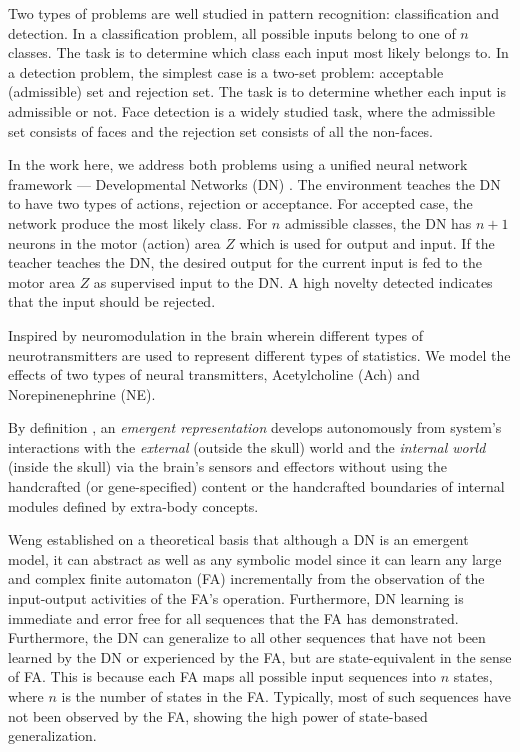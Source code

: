 \documentclass[conference]{IEEEtran}
\begin{document}
Two types of problems are well studied in pattern recognition: classification and detection.   
In a classification problem, all possible inputs belong to one of $n$ classes.   The task is to determine 
which class each input most likely belongs to.   In a detection problem, the simplest case is a two-set
problem: acceptable (admissible) set and rejection set.   The task is to determine whether each input is
admissible or not.   Face detection is a widely studied task, where the admissible set consists of faces and
the rejection set consists of all the non-faces.   

In the work here, we address both problems using a unified neural network framework --- Developmental Networks (DN) \cite{WengNAI12}.    The environment teaches the DN to have two types of actions, 
rejection or acceptance.  For accepted case, the network produce the most likely class.    For $n$ admissible
classes, the DN has $n+1$ neurons in the motor (action) area $Z$ which is used for output and input.
If the teacher teaches the DN, the desired output for the current input is fed to the motor area $Z$ as 
supervised input to the DN.  A high novelty detected indicates that the input should be rejected. 

Inspired by neuromodulation in the brain wherein different types of
neurotransmitters are used to represent different types of statistics.
We model the effects of two types of neural transmitters, Acetylcholine (Ach) and Norepinenephrine (NE).

By definition \cite{WengRepRev12}, an {\em emergent representation} develops autonomously from system's  interactions with the {\em external} (outside the skull) world and
the {\em internal world} (inside the skull) via the brain's sensors and
effectors without using the handcrafted (or gene-specified) content or the handcrafted 
boundaries of internal modules defined by extra-body concepts.
 
Weng \cite{WengWhy11} established on a theoretical basis that although a DN is an emergent model,
it can abstract as well as any symbolic model since it can learn any large and complex finite
automaton (FA) incrementally from the observation of the input-output activities of the FA's operation.
Furthermore, DN learning is immediate and error free for all sequences that the FA has demonstrated.
Furthermore, the DN can generalize to all other sequences that have not been learned by the DN or experienced by
the FA, but are state-equivalent in the sense of FA.   This is because each FA maps all possible 
input sequences into $n$ states, where $n$ is the number of states in the FA.  Typically, most of
such sequences have not been observed by the FA, showing the high power of state-based generalization. 
  
\end{document}
